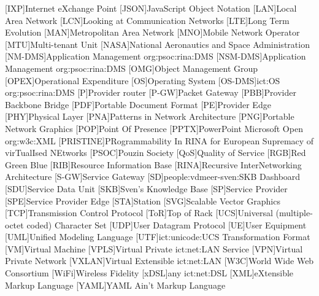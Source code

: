 \begin{acronym}[PRISTINEX]
    [IXP]{Internet eXchange Point}
    [JSON]{JavaScript Object Notation}
    [LAN]{Local Area Network}
    [LCN]{Looking at Communication Networks}
    [LTE]{Long Term Evolution}
    [MAN]{Metropolitan Area Network}
    [MNO]{Mobile Network Operator}
    [MTU]{Multi-tenant Unit}
    [NASA]{National Aeronautics and Space Administration}
    [NM-DMS]{Application Management \acs{org:psoc:rina:DMS}}
    [NSM-DMS]{Application Management \acs{org:psoc:rina:DMS}}
    [OMG]{Object Management Group}
    [OPEX]{Operational Expenditure}
    [OS]{Operating System}
    [OS-DMS]{\acl{ict:OS} \acs{org:psoc:rina:DMS}}
    [P]{Provider router}
    [P-GW]{Packet Gateway}
    [PBB]{Provider Backbone Bridge}
    [PDF]{Portable Document Format}
    [PE]{Provider Edge}
    [PHY]{Physical Layer}
    [PNA]{Patterns in Network Architecture}
    [PNG]{Portable Network Graphics}
    [POP]{Point Of Presence}
    [PPTX]{PowerPoint Microsoft Open \acs{org:w3c:XML}}
    [PRISTINE]{PRogrammability In RINA for European Supremacy of virTualIsed NEtworks}
    [PSOC]{Pouzin Society}
    [QoS]{Quality of Service}
    [RGB]{Red Green Blue}
    [RIB]{Resource Information Base}
    [RINA]{Recursive InterNetworking Architecture}
    [S-GW]{Service Gateway}
    [SD]{\acs{people:vdmeer-sven:SKB} Dashboard}
    [SDU]{Service Data Unit}
    [SKB]{Sven's Knowledge Base}
    [SP]{Service Provider}
    [SPE]{Service Provider Edge}
    [STA]{Station}
    [SVG]{Scalable Vector Graphics}
    [TCP]{Transmission Control Protocol}
    [ToR]{Top of Rack}
    [UCS]{Universal (multiple-octet coded) Character Set}
    [UDP]{User Datagram Protocol}
    [UE]{User Equipment}
    [UML]{Unified Modeling Language}
    [UTF]{\acs{ict:unicode:UCS} Transformation Format}
    [VM]{Virtual Machine}
    [VPLS]{Virtual Private \acs{ict:net:LAN} Service}
    [VPN]{Virtual Private Network}
    [VXLAN]{Virtual Extensible \acs{ict:net:LAN}}
    [W3C]{World Wide Web Consortium}
    [WiFi]{Wireless Fidelity}
    [xDSL]{any \acs{ict:net:DSL}}
    [XML]{eXtensible Markup Language}
    [YAML]{YAML Ain't Markup Language}
\end{acronym}
